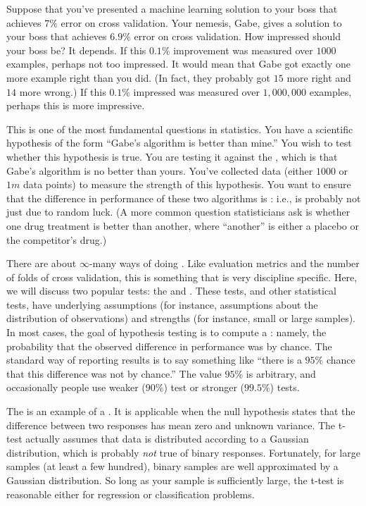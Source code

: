 Suppose that you've presented a machine learning solution to your boss
that achieves $7\%$ error on cross validation.  Your nemesis, Gabe,
gives a solution to your boss that achieves $6.9\%$ error on cross
validation.  How impressed should your boss be?  It depends.  If this
$0.1\%$ improvement was measured over $1000$ examples, perhaps not too
impressed.  It would mean that Gabe got exactly one more example right
than you did.  (In fact, they probably got $15$ more right and $14$ more
wrong.)  If this $0.1\%$ impressed was measured over $1,000,000$
examples, perhaps this is more impressive.

This is one of the most fundamental questions in statistics.  You have
a scientific hypothesis of the form ``Gabe's algorithm is better than
mine.''  You wish to test whether this hypothesis is true.  You are
testing it against the , which is that Gabe's
algorithm is no better than yours.  You've collected data (either
$1000$ or $1m$ data points) to measure the strength of this
hypothesis.  You want to ensure that the difference in performance of
these two algorithms is : i.e., is
probably not just due to random luck.  (A more common question
statisticians ask is whether one drug treatment is better than
another, where ``another'' is either a placebo or the competitor's
drug.)

There are about $\infty$-many ways of doing .  Like evaluation metrics and the number of folds of cross
validation, this is something that is very discipline specific.  Here,
we will discuss two popular tests: the  and
.  These tests, and other statistical tests,
have underlying assumptions (for instance, assumptions about the
distribution of observations) and strengths (for instance, small or
large samples).  In most cases, the goal of hypothesis testing is to
compute a : namely, the probability that the observed
difference in performance was by chance.  The standard way of
reporting results is to say something like ``there is a $95\%$ chance
that this difference was not by chance.''  The value $95\%$ is
arbitrary, and occasionally people use weaker ($90\%$) test or
stronger ($99.5\%$) tests.

The  is an example of a .  It
is applicable when the null hypothesis states that the difference
between two responses has mean zero and unknown variance.  The t-test
actually assumes that data is distributed according to a Gaussian
distribution, which is probably \emph{not} true of binary responses.
Fortunately, for large samples (at least a few hundred), binary
samples are well approximated by a Gaussian distribution.  So long as
your sample is sufficiently large, the t-test is reasonable either for
regression or classification problems.

